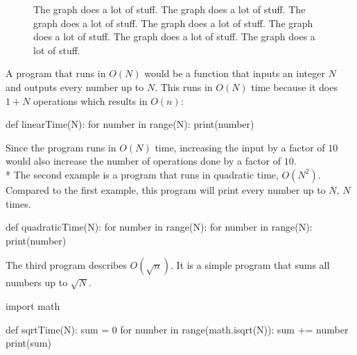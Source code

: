 \documentclass[main.tex]{subfiles}
\begin{document}
\begin{figure}[ht]
  \begin{center}
  \end{center}
  \caption{The graph does a lot of stuff. The graph does a lot of stuff. The
    graph does a lot of stuff. The graph does a lot of stuff. The graph does a
    lot of stuff. The graph does a lot of stuff. The graph does a lot of stuff.}
\end{figure}

\noindent
A program that runs in $O(N)$ would be a function that inputs an integer $N$ and
outputs every number up to $N$. This runs in $O(N)$ time because it does $1+N$
operations which results in $O(n)$:

\begin{python}
  def linearTime(N): for number in range(N): print(number)
\end{python}
\noindent
Since the program runs in $O(N)$ time, increasing the input by a factor of $10$
would also increase the number of operations done by a factor of $10$. \newline
\\*
The second example is a program that runs in quadratic time, $O(N^{2})$. Compared
to the first example, this program will print every number up to $N$, $N$ times.

\begin{python}
  def quadraticTime(N): for number in range(N): for number in range(N):
  print(number)
\end{python}

\vspace{5mm}
\noindent
The third program describes $O(\sqrt{n})$. It is a simple program that sums all
numbers up to $\sqrt{N}$.

\begin{python}
  import math

  def sqrtTime(N): sum = 0 for number in range(math.isqrt(N)): sum += number
  print(sum)
\end{python}
\end{document}
